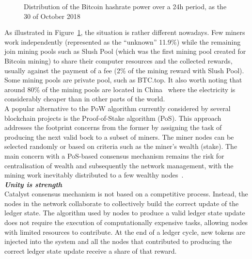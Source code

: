 \begin{figure}[H]
\caption{\label{fig:pools} Distribution of the Bitcoin hashrate power over a 24h period, as the 30 of October 2018\cite{bc24}}
\end{figure}

As illustrated in Figure~\ref{fig:pools}, the situation is rather different nowadays. Few miners work independently (represented as the “unknown” 11.9\%) while the remaining join mining pools such as Slush Pool (which was the first mining pool created for Bitcoin mining) to share their computer resources and the collected rewards, usually against the payment of a fee (2\% of the mining reward with Slush Pool). Some mining pools are private pool, such as BTC.top. It also worth noting that around 80\% of the mining pools are located in China~\cite{poolcent} where the electricity is considerably cheaper than in other parts of the world.   \\

A popular alternative to the PoW algorithm currently considered by several blockchain projects is the Proof-of-Stake algorithm (PoS). This approach addresses the footprint concerns from the former by assigning the task of producing the next valid bock to a subset of miners. The miner nodes can be selected randomly or based on criteria such as the miner’s wealth (stake). The main concern with a PoS-based consensus mechanism remains the risk for centralisation of wealth and subsequently the network management, with the mining work inevitably distributed to a few wealthy nodes~\cite{PoSr}.\\

\textbf{\textit{Unity is strength}}\\
Catalyst consensus mechanism is not based on a competitive process. Instead, the nodes in the network collaborate to collectively build the correct update of the ledger state. The algorithm used by nodes to produce a valid ledger state update does not require the execution of computationally expensive tasks, allowing nodes with limited resources to contribute. At the end of a ledger cycle, new tokens are injected into the system and all the nodes that contributed to producing the correct ledger state update receive a share of that reward.

